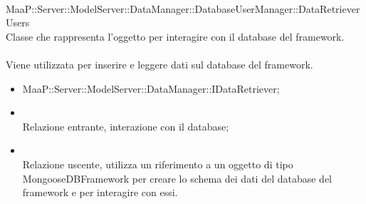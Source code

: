 \\
MaaP::Server::ModelServer::DataManager::DatabaseUserManager::DataRetrieverUsers\\
Classe che rappresenta l'oggetto per interagire con il database del framework.\\
\\
Viene utilizzata per inserire e leggere dati sul database del framework.\\
\begin{itemize}
\item MaaP::Server::ModelServer::DataManager::IDataRetriever;
\end{itemize}
\begin{itemize}
\item{}\\
Relazione entrante, interazione con il database;
\item{}\\
Relazione uscente, utilizza un riferimento a un oggetto di tipo MongooseDBFramework per creare lo schema dei dati del database del framework e per interagire con essi.
\end{itemize}



